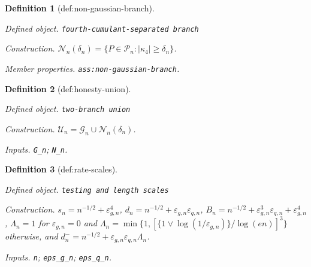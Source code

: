 \documentclass{article}
\newtheorem{definition}{Definition}
\begin{document}
\begin{definition}[def:non-gaussian-branch]\label{def:non-gaussian-branch}
\par\smallskip\noindent\emph{Defined object.} \texttt{fourth-\allowbreak{}cumulant-\allowbreak{}separated branch}
\par\smallskip\noindent\emph{Construction.} \(\mathcal N_n(\delta_n)=\{P\in\mathcal P_n:|\kappa_4|\ge\delta_n\}\).
\par\smallskip\noindent\emph{Member properties.} \texttt{ass:\allowbreak{}non-\allowbreak{}gaussian-\allowbreak{}branch}.
\end{definition}

\begin{definition}[def:honesty-union]\label{def:honesty-union}
\par\smallskip\noindent\emph{Defined object.} \texttt{two-\allowbreak{}branch union}
\par\smallskip\noindent\emph{Construction.} \(\mathcal U_n=\mathcal G_n\cup\mathcal N_n(\delta_n)\).
\par\smallskip\noindent\emph{Inputs.} \texttt{G\_\allowbreak{}n}; \texttt{N\_\allowbreak{}n}.
\end{definition}

\begin{definition}[def:rate-scales]\label{def:rate-scales}
\par\smallskip\noindent\emph{Defined object.} \texttt{testing and length scales}
\par\smallskip\noindent\emph{Construction.} \(s_n=n^{-1/2}+\varepsilon_{g,n}^4\), \(d_n=n^{-1/2}+\varepsilon_{g,n}\varepsilon_{q,n}\), \(B_n=n^{-1/2}+\varepsilon_{g,n}^3\varepsilon_{q,n}+\varepsilon_{g,n}^4\), \(\Lambda_n=1\) for \(\varepsilon_{g,n}=0\) and \(\Lambda_n=\min\{1,[\{1\vee\log(1/\varepsilon_{g,n})\}/\log(en)]^3\}\) otherwise, and \(d_n^-=n^{-1/2}+\varepsilon_{g,n}\varepsilon_{q,n}\Lambda_n\).
\par\smallskip\noindent\emph{Inputs.} \texttt{n}; \texttt{eps\_\allowbreak{}g\_\allowbreak{}n}; \texttt{eps\_\allowbreak{}q\_\allowbreak{}n}.
\end{definition}
\end{document}

